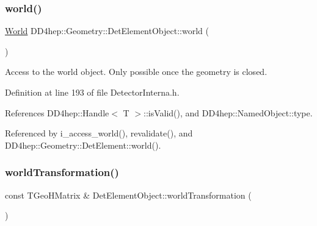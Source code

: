 \hypertarget{class_d_d4hep_1_1_geometry_1_1_det_element_object_aab07042df4ed702bedeb898bf17c180f}{}\label{class_d_d4hep_1_1_geometry_1_1_det_element_object_aab07042df4ed702bedeb898bf17c180f} 
\subsubsection{\texorpdfstring{world()}{world()}}
{\footnotesize\ttfamily \hyperlink{class_d_d4hep_1_1_geometry_1_1_world}{World} D\+D4hep\+::\+Geometry\+::\+Det\+Element\+Object\+::world (\begin{DoxyParamCaption}{ }\end{DoxyParamCaption})\hspace{0.3cm}{\ttfamily [inline]}}



Access to the world object. Only possible once the geometry is closed. 



Definition at line 193 of file Detector\+Interna.\+h.



References D\+D4hep\+::\+Handle$<$ T $>$\+::is\+Valid(), and D\+D4hep\+::\+Named\+Object\+::type.



Referenced by i\+\_\+access\+\_\+world(), revalidate(), and D\+D4hep\+::\+Geometry\+::\+Det\+Element\+::world().

\hypertarget{class_d_d4hep_1_1_geometry_1_1_det_element_object_acb5621525dd6d99d263424e298a4002b}{}\label{class_d_d4hep_1_1_geometry_1_1_det_element_object_acb5621525dd6d99d263424e298a4002b} 
\subsubsection{\texorpdfstring{world\+Transformation()}{worldTransformation()}}
{\footnotesize\ttfamily const T\+Geo\+H\+Matrix \& Det\+Element\+Object\+::world\+Transformation (\begin{DoxyParamCaption}{ }\end{DoxyParamCaption})}



